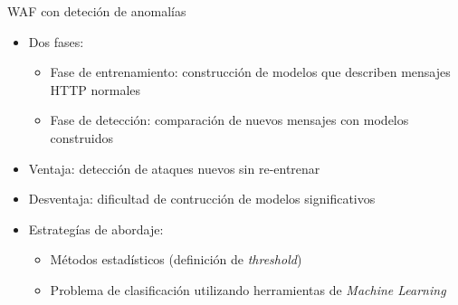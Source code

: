 \begin{frame}
    \begin{exampleblock}{WAF con deteción de anomalías}
        \begin{itemize}
            \item<1->
            Dos fases:

            \begin{itemize}[<.->]
                \item
                Fase de entrenamiento: construcción de modelos que describen
                mensajes HTTP normales

                \item
                Fase de detección: comparación de nuevos mensajes con
                modelos construidos
            \end{itemize}

            \item<2->
            Ventaja: detección de ataques nuevos sin re-entrenar

            \item<2->
            Desventaja: dificultad de contrucción de modelos significativos

            \item<3->
            Estrategías de abordaje:

            \begin{itemize}[<.->]
                \item
                Métodos estadísticos (definición de \textit{threshold})

                \item
                Problema de clasificación utilizando herramientas de
                \textit{Machine Learning}
            \end{itemize}
        \end{itemize}
    \end{exampleblock}
\end{frame}

